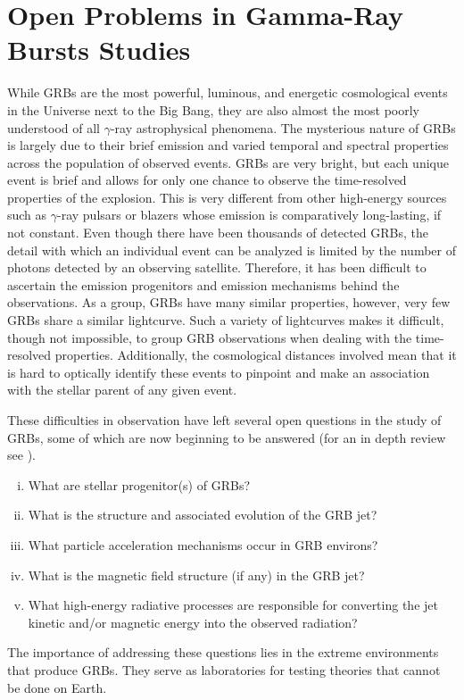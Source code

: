 \section{Open Problems in Gamma-Ray Bursts Studies}
While GRBs are the most powerful, luminous, and energetic cosmological
events in the Universe next to the Big Bang, they are also almost the
most poorly understood of all $\gamma$-ray astrophysical
phenomena. The mysterious nature of GRBs is largely due to their brief
emission and varied temporal and spectral properties across the
population of observed events. GRBs are very bright, but each unique
event is brief and allows for only one chance to observe the
time-resolved properties of the explosion. This is very different from
other high-energy sources such as $\gamma$-ray pulsars or blazers
whose emission is comparatively long-lasting, if not constant. Even
though there have been thousands of detected GRBs, the detail with
which an individual event can be analyzed is limited by the number of
photons detected by an observing satellite. Therefore, it has been
difficult to ascertain the emission progenitors and emission
mechanisms behind the observations.  As a group, GRBs have many
similar properties, however, very few GRBs share a similar
lightcurve. Such a variety of lightcurves makes it difficult, though
not impossible, to group GRB observations when dealing with the
time-resolved properties. Additionally, the cosmological distances
involved mean that it is hard to optically identify these events to
pinpoint and make an association with the stellar parent of any given
event.

These difficulties in observation have left several open questions in
the study of GRBs, some of which are now beginning to be answered (for
an in depth review see \cite{zhang:2011}).
\begin{enumerate}[(i)]
\item What are stellar progenitor(s) of GRBs?
\item What is the structure and associated evolution of the GRB jet?
\item What particle acceleration mechanisms occur in GRB environs?
\item What is the magnetic field structure (if any) in the GRB jet?
\item What high-energy radiative processes are responsible for
  converting the jet kinetic and/or magnetic energy into the observed radiation?
\end{enumerate}
The importance of addressing these questions lies in the extreme
environments that produce GRBs. They serve as laboratories for testing
theories that cannot be done on Earth.


